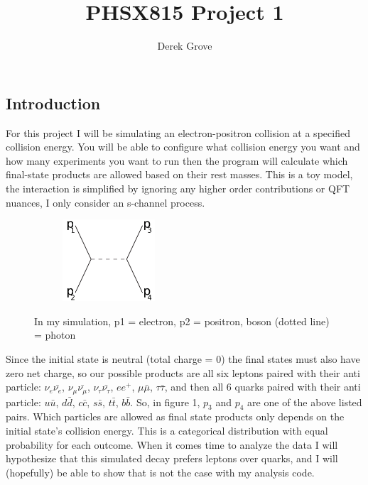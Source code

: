 \documentclass[11pt]{article}
\title{PHSX815 Project 1}
\author{Derek Grove}
\begin{document}
\maketitle
\subsection*{Introduction}
For this project I will be simulating an electron-positron collision at a specified collision energy. You will be able to configure what collision energy you want and how many experiments you want to run then the program will calculate which final-state products are allowed based on their rest masses. This is a toy model, the interaction is simplified by ignoring any higher order contributions or QFT nuances, I only consider an s-channel process. 

\begin{figure}[h!]
    \centering
    \begin{subfigure}[b]{0.4\linewidth}
      \includegraphics[width=130px]{Schannel.png}
    \end{subfigure}
    \caption{In my simulation, p1 = electron, p2 = positron, boson (dotted line) = photon}
    \label{fig:s-channel process}
  \end{figure}
  \vspace{1px}

Since the initial state is neutral (total charge = 0) the final states must also have zero net charge, so our possible products are all six leptons paired with their anti particle: $\nu_e\bar{\nu_e}$, $\nu_\mu\bar{\nu_\mu}$, $\nu_\tau\bar{\nu_\tau}$, $ee^+$, $\mu\bar{\mu}$, $\tau\bar{\tau}$, and then all 6 quarks paired with their anti particle: $u\bar{u}$, $d\bar{d}$, $c\bar{c}$, $s\bar{s}$, $t\bar{t}$, $b\bar{b}$. So, in figure 1, $p_3$ and $p_4$ are one of the above listed pairs. Which particles are allowed as final state products only depends on the initial state's collision energy. This is a categorical distribution with equal probability for each outcome. When it comes time to analyze the data I will hypothesize that this simulated decay prefers leptons over quarks, and I will (hopefully) be able to show that is not the case with my analysis code.
\end{document}
